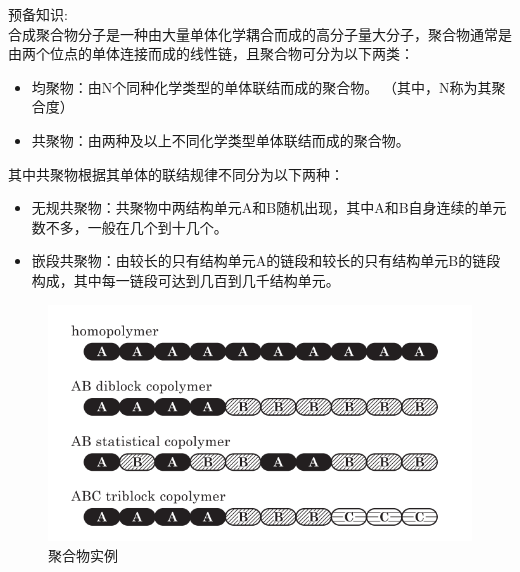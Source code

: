 
预备知识:\\

合成聚合物分子是一种由大量单体化学耦合而成的高分子量大分子，聚合物通常是由两个位点的单体连接而成的线性链，且聚合物可分为以下两类：
\begin{itemize}
	\item 均聚物：由N个同种化学类型的单体联结而成的聚合物。
	（其中，N称为其聚合度）
	\item 共聚物：由两种及以上不同化学类型单体联结而成的聚合物。
\end{itemize}
其中共聚物根据其单体的联结规律不同分为以下两种：
\begin{itemize}
	\item 无规共聚物：共聚物中两结构单元A和B随机出现，其中A和B自身连续的单元数不多，一般在几个到十几个。
	\item 嵌段共聚物：由较长的只有结构单元A的链段和较长的只有结构单元B的链段构成，其中每一链段可达到几百到几千结构单元。
\end{itemize}

\begin{figure}[h]
	\centering
	\includegraphics[scale=0.5
    ]{Contents/chapter2/figures/1-1.png}
	\caption{聚合物实例}
\end{figure}


